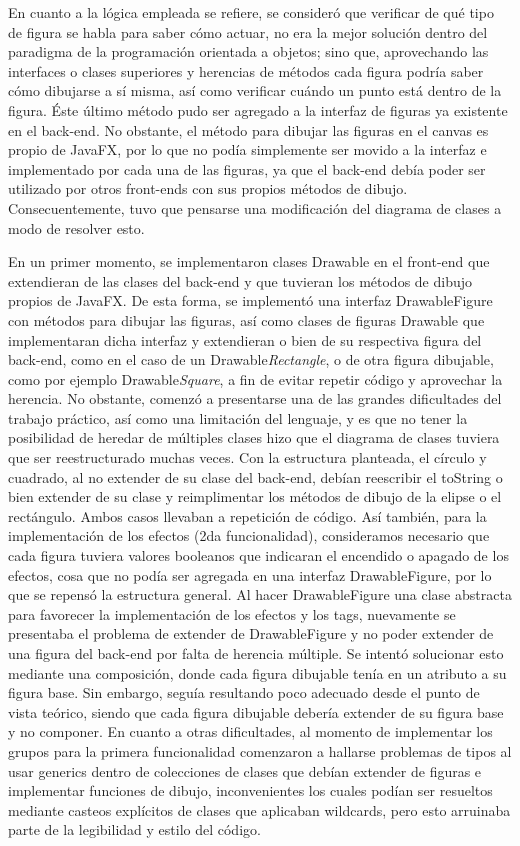 \documentclass[12pt]{article}
\begin{document}
En cuanto a la lógica empleada se refiere, se consideró que verificar de qué tipo de figura se habla para saber cómo actuar, no era la mejor solución dentro del paradigma de la programación orientada a objetos; sino que, aprovechando las interfaces o clases superiores y herencias de métodos cada figura podría saber cómo dibujarse a sí misma, así como verificar cuándo un punto está dentro de la figura. Éste último método pudo ser agregado a la interfaz de figuras ya existente en el back-end. No obstante, el método para dibujar las figuras en el canvas es propio de JavaFX, por lo que no podía simplemente ser movido a la interfaz e implementado por cada una de las figuras, ya que el back-end debía poder ser utilizado por otros front-ends con sus propios métodos de dibujo. Consecuentemente, tuvo que pensarse una modificación del diagrama de clases a modo de resolver esto.

En un primer momento, se implementaron clases Drawable en el front-end que extendieran de las clases del back-end y que tuvieran los métodos de dibujo propios de JavaFX. De esta forma, se implementó una interfaz DrawableFigure con métodos para dibujar las figuras, así como clases de figuras Drawable que implementaran dicha interfaz y extendieran o bien de su respectiva figura del back-end, como en el caso de un Drawable\textit{Rectangle}, o de otra figura dibujable, como por ejemplo Drawable\textit{Square}, a fin de evitar repetir código y aprovechar la herencia. No obstante, comenzó a presentarse una de las grandes dificultades del trabajo práctico, así como una limitación del lenguaje, y es que no tener la posibilidad de heredar de múltiples clases hizo que el diagrama de clases tuviera que ser reestructurado muchas veces. Con la estructura planteada, el círculo y cuadrado, al no extender de su clase del back-end, debían reescribir el toString o bien extender de su clase y reimplimentar los métodos de dibujo de la elipse o el rectángulo. Ambos casos llevaban a repetición de código. Así también, para la implementación de los efectos (2da funcionalidad), consideramos necesario que cada figura tuviera valores booleanos que indicaran el encendido o apagado de los efectos, cosa que no podía ser agregada en una interfaz DrawableFigure, por lo que se repensó la estructura general. Al hacer DrawableFigure una clase abstracta para favorecer la implementación de los efectos y los tags, nuevamente se presentaba el problema de extender de DrawableFigure y no poder extender de una figura del back-end por falta de herencia múltiple. Se intentó solucionar esto mediante una composición, donde cada figura dibujable tenía en un atributo a su figura base. Sin embargo, seguía resultando poco adecuado desde el punto de vista teórico, siendo que cada figura dibujable debería extender de su figura base y no componer. En cuanto a otras dificultades, al momento de implementar los grupos para la primera funcionalidad comenzaron a hallarse problemas de tipos al usar generics dentro de colecciones de clases que debían extender de figuras e implementar funciones de dibujo, inconvenientes los cuales podían ser resueltos mediante casteos explícitos de clases que aplicaban wildcards, pero esto arruinaba parte de la legibilidad y estilo del código. 
\end{document}
